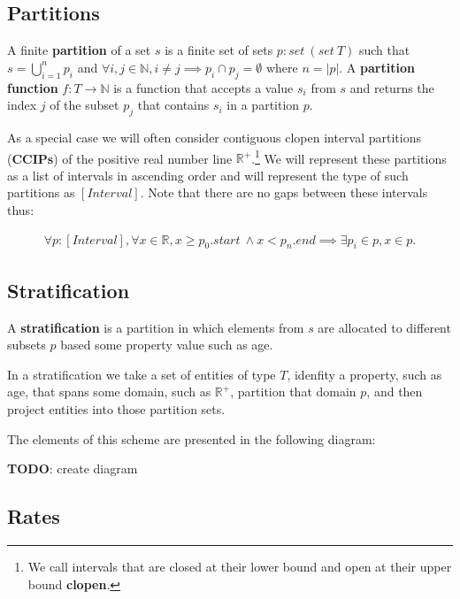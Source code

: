 \documentclass[]{article}
\begin{document}
\hypertarget{partitions}{%
\subsection{Partitions}\label{partitions}}

A finite \textbf{partition} of a set \(s\) is a finite set of sets
\(p : set\ (set\ T)\) such that \(s = \bigcup_{i=1}^n p_i\) and
\(\forall i, j \in \mathbb{N}, i \neq j \implies p_i \cap p_j = \emptyset\)
where \(n = |p|\). A \textbf{partition function}
\(f : T \rightarrow \mathbb{N}\) is a function that accepts a value
\(s_i\) from \(s\) and returns the index \(j\) of the subset \(p_j\)
that contains \(s_i\) in a partition \(p\).

As a special case we will often consider contiguous clopen interval
partitions (\textbf{CCIPs}) of the positive real number line
\(\mathbb{R}^+\).\footnote{We call intervals that are closed at their
  lower bound and open at their upper bound \textbf{clopen}.} We will
represent these partitions as a list of intervals in ascending order and
will represent the type of such partitions as \([Interval]\). Note that
there are no gaps between these intervals thus:

\begin{align*}
\forall p : [Interval], \forall x \in \mathbb{R}, x \ge p_0.start\ \wedge x < p_n.end \implies \exists p_i \in p, x \in p.
\end{align*}

\hypertarget{stratification}{%
\subsection{Stratification}\label{stratification}}

A \textbf{stratification} is a partition in which elements from \(s\)
are allocated to different subsets \(p\) based some property value such
as age.

In a stratification we take a set of entities of type \(T\), idenfity a
property, such as age, that spans some domain, such as \(\mathbb{R}^+\),
partition that domain \(p\), and then project entities into those
partition sets.

The elements of this scheme are presented in the following diagram:

\textbf{TODO}: create diagram

\hypertarget{rates}{%
\subsection{Rates}\label{rates}}
\end{document}
